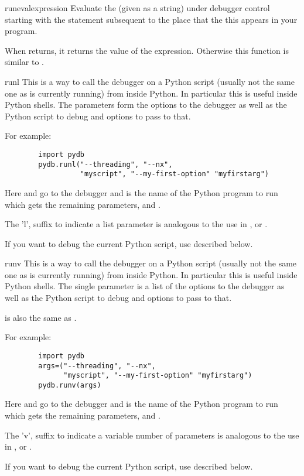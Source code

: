 \begin{funcdesc}{runeval}{expression}
Evaluate the  (given as a string) under debugger
control starting with the statement subsequent to the place that the
this appears in your program.

When  returns, it returns the value of the
expression.  Otherwise this function is similar to
.
\end{funcdesc}

\begin{funcdesc}{runl}{ }
This is a way to call the debugger on a Python script (usually not the
same one as is currently running) from inside Python. In particular
this is useful inside Python shells.  The parameters form the options
to the debugger as well as the Python script to debug and options to
pass to that.

For example:
\begin{verbatim}
        import pydb
        pydb.runl("--threading", "--nx",
                  "myscript", "--my-first-option" "myfirstarg")
\end{verbatim}

Here  and  go to the debugger and
 is the name of the Python program to run which gets the
remaining parameters,  and .

The 'l', suffix to indicate a list parameter is analogous to the use
in , or .

If you want to debug the current Python script, use 
described below.

\end{funcdesc}

\begin{funcdesc}{runv}{}
This is a way to call the debugger on a Python script (usually not the
same one as is currently running) from inside Python. In particular
this is useful inside Python shells.  The single parameter is a list
of the options to the debugger as well as the Python script to debug
and options to pass to that.

 is also the same as .

For example:
\begin{verbatim}
        import pydb
        args=("--threading", "--nx",
              "myscript", "--my-first-option" "myfirstarg")
        pydb.runv(args)
\end{verbatim}

Here  and  go to the debugger and
 is the name of the Python program to run which gets the
remaining parameters,  and .

The 'v', suffix to indicate a variable number of parameters is analogous to
the use in , or .

If you want to debug the current Python script, use 
described below.
\end{funcdesc}

